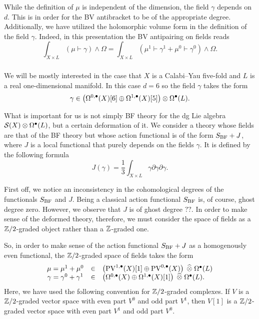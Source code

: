 \documentclass[11pt]{amsart}
\def\pv{{\rm PV}}
\begin{document}
While the definition of $\mu$ is independent of the dimension, the field $\gamma$ depends on $d$.
This is in order for the BV antibracket to be of the appropriate degree.
Additionally, we have utilized the holomorphic volume form in the definition of the field $\gamma$.
Indeed, in this presentation the BV antipairing on fields reads
\[
  \int_{X \times L} (\mu \vdash \gamma) \wedge \Omega = \int_{X \times L} (\mu^1 \vdash \gamma^1 + \mu^0 \vdash \gamma^0) \wedge \Omega .
\]

\subsubsection{}
We will be mostly interested in the case that $X$ is a Calabi--Yau five-fold and $L$ is a real one-dimensional manifold.
In this case $d = 6$ so the field $\gamma$ takes the form
\[
  \gamma \in \left(\Omega^{0,\bullet}(X)[6] \oplus \Omega^{1,\bullet}(X)[5] \right) \otimes \Omega^\bullet(L).
\]

What is important for us is not simply BF theory for the dg Lie algebra $\mathcal S(X) \otimes \Omega^\bullet(L)$, but a certain deformation of it.
We consider a theory whose fields are that of the BF theory but whose action functional is of the form $S_{\rm BF} + J$, where $J$ is a local functional that purely depends on the fields $\gamma$.
It is defined by the following formula
\[
J(\gamma) = \frac13 \int_{X\times L} \gamma \partial \gamma \partial \gamma .
\]

First off, we notice an inconsistency in the cohomological degrees of the functionals $S_{\rm BF}$ and $J$.
Being a classical action functional $S_{\rm BF}$ is, of course, ghost degree zero.
However, we observe that $J$ is of ghost degree $??$.
In order to make sense of the deformed theory, therefore, we must consider the space of fields as a $\mathbb Z/2$-graded object rather than a $\mathbb Z$-graded one.

So, in order to make sense of the action functional $S_{\rm BF} + J$ as a homogenously even functional, the $\mathbb Z/2$-graded space of fields takes the form
\[
  \begin{array}{ccl}
    \mu = \mu^1+\mu^0 & \in & \left(\pv^{1,\bu}(X)[1] \oplus \pv^{0,\bu}(X) \right) \; \Hat{\otimes} \; \Omega^{\bu}(L) \\
    \gamma = \gamma^0+ \gamma^1 & \in & \left(\Omega^{0,\bu}(X) \oplus \Omega^{1,\bu}(X)[1] \right) \; \Hat{\otimes}\; \Omega^{\bu}(L) .
  \end{array}
\]
Here, we have used the following convention for $\mathbb Z/2$-graded complexes.
If $V$ is a $\mathbb Z/2$-graded vector space with even part $V^0$ and odd part $V^1$, then $V[1]$ is a $\mathbb Z/2$-graded vector space with even part $V^1$ and odd part $V^0$.
\end{document}
